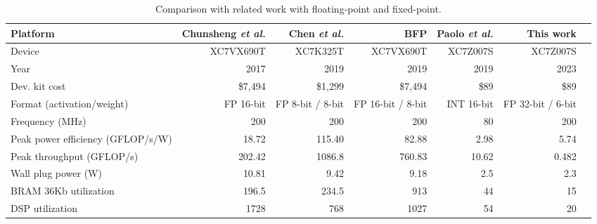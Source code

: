 \documentclass{article}
\begin{document}
	\thispagestyle{empty} %
	
	
	\begin{center}
		\begin{table*}[!t]\centering
			\caption{Comparison with related work with floating-point and fixed-point.}\label{tab:comparison}
			\scriptsize
			\begin{tabular}{lrrrrrr}\toprule
				Platform &Chunsheng \textit{et al.} \cite{mei2017200mhz} &Chen \textit{et al.} \cite{wu2021low} &BFP \cite{lian2019high} &Paolo \textit{et al.} \cite{meloni2019cnn} &This work \\\midrule
				Device &XC7VX690T &XC7K325T &XC7VX690T &XC7Z007S &XC7Z007S \\
				Year &2017 &2019 &2019 &2019 &2023 \\
				Dev. kit cost &\$7,494 &\$1,299 &\$7,494 &\$89 &\$89 \\
				Format (activation/weight) &FP 16-bit &FP 8-bit / 8-bit &FP 16-bit / 8-bit &INT 16-bit &FP 32-bit / 6-bit \\
				Frequency (MHz) &200 &200 &200 &80 &200 \\
				Peak power efficiency (GFLOP/s/W) &18.72 &115.40 &82.88 &2.98 &5.74 \\
				Peak throughput (GFLOP/s) & 202.42 & 1086.8 & 760.83 &  10.62& 0.482\\
				Wall plug power (W) &10.81 &9.42 &9.18 &2.5 &2.3 \\
				BRAM 36Kb utilization &196.5 &234.5 &913 &44 &15 \\
				DSP utilization &1728 &768 &1027 &54 &20 \\
				\bottomrule
			\end{tabular}
		\end{table*}
	\end{center}
	
\end{document}
